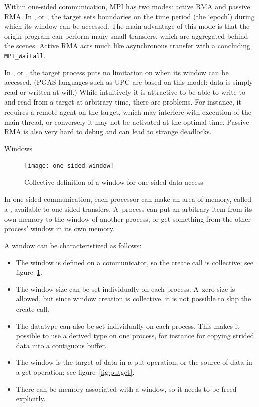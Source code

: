 Within one-sided communication, MPI has two modes: active RMA and
passive RMA. In , or ,
the target sets boundaries on the time period (the `epoch')
during which its window can be accessed.
The main advantage
of this mode is that the origin program can perform many small transfers, which are
aggregated behind the scenes. Active RMA acts much like asynchronous transfer with a
concluding \lstinline$MPI_Waitall$.

In , or ,
the target process puts no limitation on when its window can be accessed.
(\ac{PGAS} languages such as \ac{UPC} are based on this model: data is 
simply read or written at will.)
While 
intuitively it is attractive to be able to write to and read from a target at
arbitrary time,
there are problems. For instance, it requires a remote agent on the target,
which may interfere with execution of the main thread, or conversely it may not be
activated at the optimal time. Passive RMA is also very hard to debug and can lead
to strange deadlocks.


 {Windows}
\label{sec:windows}

\begin{figure}[ht]
  \texttt{[image: one-sided-window]}
  \caption{Collective definition of a window for one-sided data access}
  \label{fig:window}
\end{figure}

In one-sided communication, each processor can make an area of memory,
called a , available to one-sided transfers.
A~process can put an arbitrary item from its own memory to the
window of another process, or get something from the other process'
window in its own memory.

A window can be characteristized as follows:
\begin{itemize}
\item The window is defined on a communicator, so the create call
  is collective; see figure~\ref{fig:window}. 
\item The window size can be set individually on each process.
  A~zero size is allowed, but since window creation is collective,
  it is not possible to skip the create call.
\item The datatype can also be set individually on each process. This
  makes it possible to use a derived type on one process, for instance
  for copying strided data into a contiguous buffer.
\item The window is the target of data in a put operation, or the
  source of data in a get operation; see figure~\ref{fig:putget}.
\item There can be memory associated with a window, so it needs to be
  freed explicitly.
\end{itemize}

